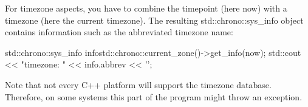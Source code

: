 For timezone aspects, you have to combine the timepoint (here now) with a timezone (here the current timezone). The resulting std::chrono::sys\_info object contains information such as the abbreviated timezone name:

\begin{cpp}
std::chrono::sys_info info{std::chrono::current_zone()->get_info(now)};
std::cout << "timezone: " << info.abbrev << '\n';
\end{cpp}

Note that not every C++ platform will support the timezone database. Therefore, on some systems this part of the program might throw an exception.




















